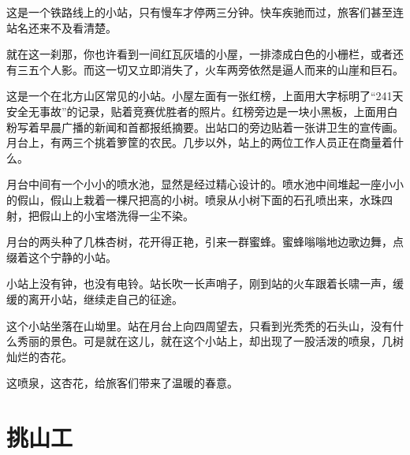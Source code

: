 \documentclass[12pt,UTF-8,openany]{ctexbook}
\begin{document}
\begin{large}
    
    这是一个铁路线上的小站，只有慢车才停两三分钟。快车疾驰而过，旅客们甚至连站名还来不及看清楚。
    
    就在这一刹那，你也许看到一间红瓦灰墙的小屋，一排漆成白色的小栅栏，或者还有三五个人影。而这一切又立即消失了，火车两旁依然是逼人而来的山崖和巨石。
    
    这是一个在北方山区常见的小站。小屋左面有一张红榜，上面用大字标明了“241天安全无事故”的记录，贴着竞赛优胜者的照片。红榜旁边是一块小黑板，上面用白粉写着早晨广播的新闻和首都报纸摘要。出站口的旁边贴着一张讲卫生的宣传画。月台上，有两三个挑着箩筐的农民。几步以外，站上的两位工作人员正在商量着什么。
    
    月台中间有一个小小的喷水池，显然是经过精心设计的。喷水池中间堆起一座小小的假山，假山上栽着一棵尺把高的小树。喷泉从小树下面的石孔喷出来，水珠四射，把假山上的小宝塔洗得一尘不染。
    
    月台的两头种了几株杏树，花开得正艳，引来一群蜜蜂。蜜蜂嗡嗡地边歌边舞，点缀着这个宁静的小站。
    
    小站上没有钟，也没有电铃。站长吹一长声哨子，刚到站的火车跟着长啸一声，缓缓的离开小站，继续走自己的征途。
    
    这个小站坐落在山坳里。站在月台上向四周望去，只看到光秃秃的石头山，没有什么秀丽的景色。可是就在这儿，就在这个小站上，却出现了一股活泼的喷泉，几树灿烂的杏花。
    
    这喷泉，这杏花，给旅客们带来了温暖的春意。
    
\end{large}



\chapter{挑山工}
\end{document}
